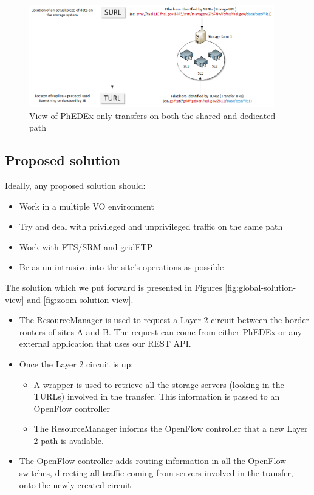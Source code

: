\begin{figure}[h]
  \centering
  \includegraphics[width=0.95\textwidth]{Figures/TURL_to_SURL.png}
  \caption{View of PhEDEx-only transfers on both the shared and dedicated path}
  \label{fig:SURL-to-TURLs}
\end{figure} 

\subsection{Proposed solution}

Ideally, any proposed solution should:
\begin{itemize}
	\item Work in a multiple VO environment
	\item Try and deal with privileged and unprivileged traffic on the same path
	\item Work with FTS/SRM and gridFTP
	\item Be as un-intrusive into the site's operations as possible
\end{itemize}

The solution which we put forward is presented in Figures \ref{fig:global-solution-view} 
and \ref{fig:zoom-solution-view}. 

\begin{itemize}
	\item The ResourceManager is used to request a Layer 2 circuit between the border routers
	of sites A and B. The request can come from either PhEDEx or any external application that 
	uses our REST API.
	\item Once the Layer 2 circuit is up:
		\begin{itemize}
			\item A wrapper is used to retrieve all the storage servers (looking in the TURLs) 
			involved in the transfer. This information is passed to an OpenFlow controller
			\item The ResourceManager informs the OpenFlow controller that a new Layer 2 path 
			is available.
		\end{itemize}
	\item The OpenFlow controller adds routing information in all the OpenFlow switches, 
	directing all traffic coming from servers involved in the transfer, onto the newly created 
	circuit
\end{itemize}

